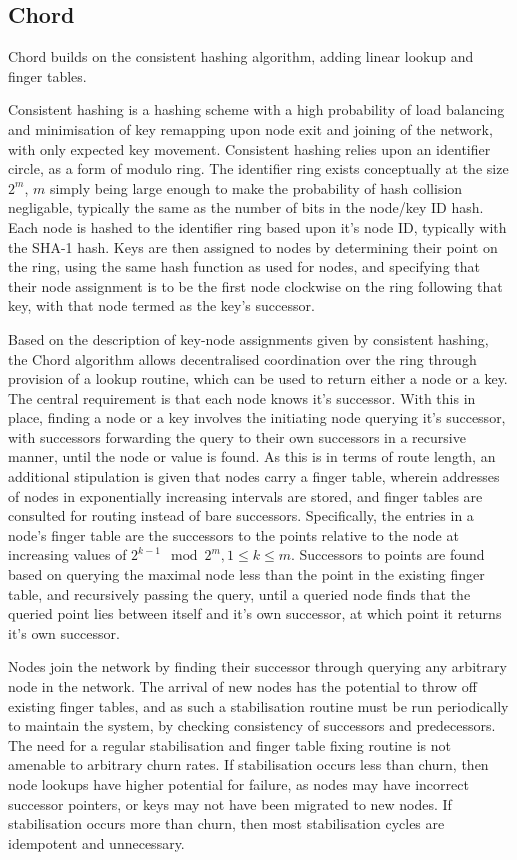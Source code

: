 \documentclass[10pt, a4paper]{article}
\begin{document}
\subsection{Chord}

Chord builds on the consistent hashing algorithm, adding linear lookup and finger tables.

Consistent hashing is a hashing scheme with a high probability of load balancing and minimisation of key remapping upon node exit and joining of the network, with only  expected key movement.
Consistent hashing relies upon an identifier circle, as a form of modulo ring.
The identifier ring exists conceptually at the size $2^m$, $m$ simply being large enough to make the probability of hash collision negligable, typically the same as the number of bits in the node/key ID hash.
Each node is hashed to the identifier ring based upon it's node ID, typically with the SHA-1 hash.
Keys are then assigned to nodes by determining their point on the ring, using the same hash function as used for nodes, and specifying that their node assignment is to be the first node clockwise on the ring following that key, with that node termed as the key's successor.

Based on the description of key-node assignments given by consistent hashing, the Chord algorithm allows decentralised coordination over the ring through provision of a lookup routine, which can be used to return either a node or a key.
The central requirement is that each node knows it's successor.
With this in place, finding a node or a key involves the initiating node querying it's successor, with successors forwarding the query to their own successors in a recursive manner, until the node or value is found.
As this is  in terms of route length, an additional stipulation is given that nodes carry a finger table, wherein addresses of nodes in exponentially increasing intervals are stored, and finger tables are consulted for routing instead of bare successors.
Specifically, the entries in a node's finger table are the successors to the points relative to the node at increasing values of $2^{k-1} \mod 2^m, 1 \leq k \leq m$.
Successors to points are found based on querying the maximal node less than the point in the existing finger table, and recursively passing the query, until a queried node finds that the queried point lies between itself and it's own successor, at which point it returns it's own successor.

Nodes join the network by finding their successor through querying any arbitrary node in the network.
The arrival of new nodes has the potential to throw off existing finger tables, and as such a stabilisation routine must be run periodically to maintain the system, by checking consistency of successors and predecessors.
The need for a regular stabilisation and finger table fixing routine is not amenable to arbitrary churn rates.
If stabilisation occurs less than churn, then node lookups have higher potential for failure, as nodes may have incorrect successor pointers, or keys may not have been migrated to new nodes.
If stabilisation occurs more than churn, then most stabilisation cycles are idempotent and unnecessary.
\end{document}
